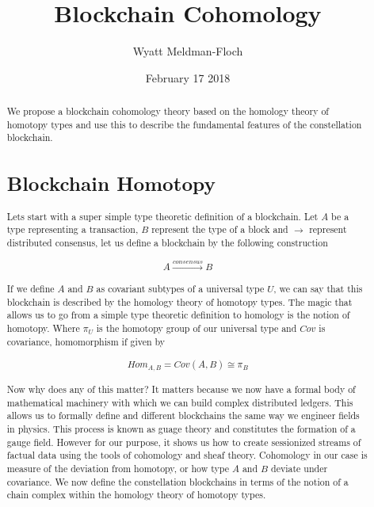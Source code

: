 \documentclass{article}
\title{Blockchain Cohomology}
\author{Wyatt Meldman-Floch}
\date{February 17 2018}
\begin{document}
\maketitle

\begin{abstract}
We propose a blockchain cohomology theory based on the homology theory of homotopy types and use this to describe the fundamental features of the constellation blockchain.

\section{Blockchain Homotopy}
Lets start with a super simple type theoretic definition of a blockchain. Let $A$ be a type representing a transaction, $B$ represent the type of a block and $\rightarrow$ represent distributed consensus, let us define a blockchain by the following construction

\begin{equation} \label{eq1}
\begin{split}
A \xrightarrow{consensus} B
\end{split}
\end{equation}

If we define $A$ and $B$ as covariant subtypes of a universal type $U$, we can say that this blockchain is described by the homology theory of homotopy types. The magic that allows us to go from a simple type theoretic definition to homology is the notion of homotopy. Where $\pi_U$ is the homotopy group of our universal type and $Cov$ is covariance, homomorphism if given by

\begin{equation} \label{eq1} 
\begin{split}
Hom_{A, B} = Cov(A,B) \cong  \pi_B
\end{split}
\end{equation}

Now why does any of this matter? It matters because we now have a formal body of mathematical machinery with which we can build complex distributed ledgers. This allows us to formally define and different blockchains the same way we engineer fields in physics. This process is known as guage theory and constitutes the formation of a gauge field. However for our purpose, it shows us how to create sessionized streams of factual data using the tools of cohomology and sheaf theory. Cohomology in our case is measure of the deviation from homotopy, or how type $A$ and $B$ deviate under covariance. We now define the constellation blockchains in terms of the notion of a chain complex within the homology theory of homotopy types.


\end{abstract}
\end{document}
